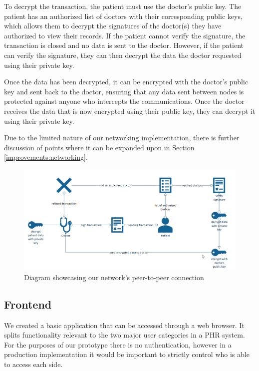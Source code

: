 \documentclass{article}
\begin{document}
To decrypt the transaction, the patient must use the doctor's public key. The patient has an authorized list of doctors with their corresponding public keys, which allows them to decrypt the signatures of the doctor(s) they have authorized to view their records. If the patient cannot verify the signature, the transaction is closed and no data is sent to the doctor. However, if the patient can verify the signature, they can then decrypt the data the doctor requested using their private key.

Once the data has been decrypted, it can be encrypted with the doctor's public key and sent back to the doctor, ensuring that any data sent between nodes is protected against anyone who intercepts the communications. Once the doctor receives the data that is now encrypted using their public key, they can decrypt it using their private key.

Due to the limited nature of our networking implementation, there is further discussion of points where it can be expanded upon in Section \ref{improvements:networking}. 

\begin{figure}[h]
\centering
\includegraphics[width=\textwidth]{images/peer-to-peer.png}
\caption{Diagram showcasing our network's peer-to-peer connection}
\label{fig:peer-to-peer}
\end{figure}

\subsection{Frontend}
We created a basic application that can be accessed through a web browser. It splits functionality relevant to the two major user categories in a PHR system. For the purposes of our prototype there is no authentication, however in a production implementation it would be important to strictly control who is able to access each side.
\end{document}
